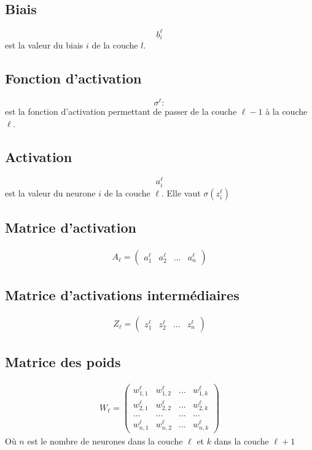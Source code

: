 \documentclass[10pt,a4paper,titlepage]{article}
\begin{document}
\subsection{Biais}
\[b_{i}^\ell\] est la valeur du biais $i$ de la couche $l$.

\subsection{Fonction d'activation}
\[\sigma^{\ell}:\] est la fonction d'activation permettant de passer de la couche $\ell - 1$ à la couche $\ell$.

\subsection{Activation}
\[a_{i}^\ell\] est la valeur du neurone $i$ de la couche $\ell$. Elle vaut $\sigma(z_{i}^\ell)$

\subsection{Matrice d'activation}
\begin{align*}
A_\ell =
\begin{pmatrix} a_1^\ell & a_2^\ell & ... & a_n^\ell
\end{pmatrix}
\end{align*}

\subsection{Matrice d'activations intermédiaires}
\begin{align*}
Z_\ell =
\begin{pmatrix} z_1^\ell & z_2^\ell & ... & z_n^\ell
\end{pmatrix}
\end{align*}

\subsection{Matrice des poids}
\begin{align*}
W_{\ell} =
\begin{pmatrix} w_{1, 1}^\ell & w_{1,2}^\ell & ... & w_{1,k}^\ell \\ 
w_{2,1}^\ell & w_{2,2}^\ell & ... & w_{2,k}^\ell \\
... & ... & ... & ... \\
w_{n,1}^\ell & w_{n,2}^\ell & ... & w_{n,k}^\ell
\end{pmatrix}
\end{align*}
Où $n$ est le nombre de neurones dans la couche $\ell$ et $k$ dans la couche $\ell+1$
\end{document}
